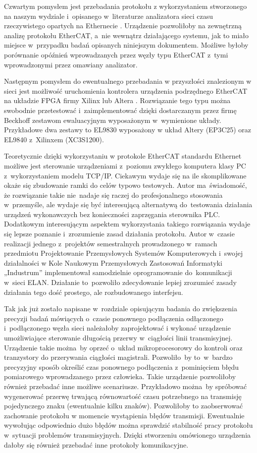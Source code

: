 Czwartym pomysłem jest przebadania protokołu z wykorzystaniem stworzonego na naszym wydziale i~opisanego w~literaturze analizatora sieci czasu rzeczywistego opartych na Ethernecie \cite{projekt_FPGA}. Urządzenie pozwoliłoby na zewnętrzną analizę protokołu EtherCAT, a~nie wewnątrz działającego systemu, jak to miało miejsce w~przypadku badań opisanych niniejszym dokumentem. Możliwe byłoby porównanie opóźnień wprowadzanych przez węzły typu EtherCAT z~tymi wprowadzonymi przez omawiany analizator.

Następnym pomysłem do ewentualnego przebadania w przyszłości znalezionym w sieci jest możliwość uruchomienia kontrolera urządzenia podrzędnego EtherCAT na układzie FPGA firmy Xilinx lub Altera \cite{FPGA_Xilinx, FPGA_Altera}. Rozwiązanie tego typu można swobodnie przetestować i~zaimplementować dzięki dostarczanym przez firmę Beckhoff zestawom ewaluacyjnym wyposażonym w~wymienione układy. Przykładowe dwa zestawy to EL9830 wyposażony w układ Altery (EP3C25) oraz EL9840 z~Xilinxem (XC3S1200).

Teoretycznie dzięki wykorzystaniu w protokole EtherCAT standardu Ethernet możliwe jest sterowanie urządzeniami z~poziomu zwykłego komputera klasy PC z~wykorzystaniem modelu TCP/IP. Ciekawym wydaje się na ile skomplikowane okaże się zbudowanie ramki do celów typowo testowych. Autor ma~świadomość, że rozwiązanie takie nie~nadaje się raczej do profesjonalnego stosowania w~przemyśle, ale wydaje się być interesującą alternatywą do~testowania działania urządzeń wykonawczych bez konieczności zaprzęgania sterownika PLC. Dodatkowym interesującym aspektem wykorzystania takiego rozwiązania wydaje się lepsze poznanie i~zrozumienie zasad działania protokołu. Autor w~czasie realizacji jednego z~projektów semestralnych prowadzonego w~ramach przedmiotu Projektowanie Przemysłowych Systemów Komputerowych i~swojej działalności w Kole Naukowym Przemysłowych Zastosowań Informatyki „Industrum” implementował samodzielnie oprogramowanie do~komunikacji w~sieci ELAN. Działanie to~pozwoliło zdecydowanie lepiej zrozumieć zasady działania tego dość prostego, ale rozbudowanego interfejsu.

Tak jak już zostało napisane w~rozdziale opisującym badania do zwiększenia precyzji badań mówiących o~czasie ponownego podłączenia odłączonego i~podłączonego węzła sieci należałoby zaprojektować i wykonać urządzenie umożliwiające sterowanie długością przerwy w~ciągłości linii transmisyjnej. Urządzenie takie można~by oprzeć o~układ mikroprocesorowy do kontroli oraz tranzystory do przerywania ciągłości magistrali. Pozwoliło~by to~w~bardzo precyzyjny sposób określić czas ponownego podłączenia z~pominięciem błędu pomiarowego wprowadzanego przez człowieka. Takie urządzenie pozwoliłoby również przebadać inne możliwe scenariusze. Przykładowo można~by spróbować wygenerować przerwę trwającą równowartość czasu potrzebnego na transmisję pojedynczego znaku (ewentualnie kilku znaków). Pozwoliłoby to zaobserwować zachowanie protokołu w momencie wystąpienia błędów transmisji. Ewentualnie wywołując odpowiednio dużo błędów można sprawdzić stabilność pracy protokołu w~sytuacji problemów transmisyjnych.
Dzięki stworzeniu omówionego urządzenia dałoby się również przebadać inne protokoły komunikacyjne.
